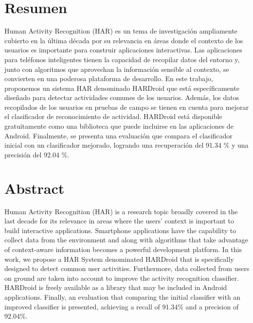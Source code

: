 
\chapter*{Resumen}
Human Activity Recognition (HAR) es un tema de investigación ampliamente cubierto en la última década por su relevancia en áreas donde el contexto de los usuarios es importante para construir aplicaciones interactivas. Las aplicaciones para teléfonos inteligentes tienen la capacidad de recopilar datos del entorno y, junto con algoritmos que aprovechan la información sensible al contexto, se convierten en una poderosa plataforma de desarrollo. En este trabajo, proponemos un sistema HAR denominado HARDroid que está específicamente diseñado para detectar actividades comunes de los usuarios. Además, los datos recopilados de los usuarios en pruebas de campo se tienen en cuenta para mejorar el clasificador de reconocimiento de actividad. HARDroid está disponible gratuitamente como una biblioteca que puede incluirse en las aplicaciones de Android. Finalmente, se presenta una evaluación que compara el clasificador inicial con un clasificador mejorado, logrando una recuperación del 91.34 \% y una precisión del 92.04 \%.


\chapter*{Abstract}
Human Activity Recognition (HAR) is a research topic broadly covered in the last decade for its relevance in areas where the users’ context is important to build interactive applications. Smartphone applications have the capability to collect data from the environment and along with algorithms that take advantage of context-aware information becomes a powerful development platform. In this work, we propose a HAR System denominated HARDroid that is specifically designed to detect common user activities. Furthermore, data collected from users on ground are taken into account to improve the activity recognition classifier. HARDroid is freely available as a library that may be included in Android applications. Finally, an evaluation that comparing the initial classifier with an improved classifier is presented, achieving a recall of 91.34\% and a precision of 92.04\%.

